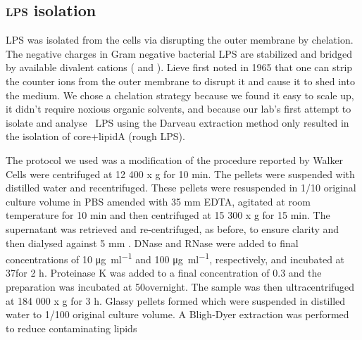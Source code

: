 	\subsection{\textsc{lps} isolation} %
	\label{sub:LPS_isolation}
  \ac{LPS} was isolated from the cells via disrupting the outer membrane by chelation.  The negative charges in Gram negative bacterial \ac{LPS} are stabilized and bridged by available
  divalent cations (\ie{}  and ). Lieve first noted in 1965 that
  one can strip the counter ions from the outer membrane to disrupt it and cause it to shed into the
  medium. We chose a chelation strategy because we found it easy to scale up, it didn't require
  noxious organic solvents, and because our lab's first attempt to isolate and analyse \caulobacter\
  \ac{LPS} using the Darveau extraction method only
  resulted in the isolation of core+lipidA (rough \ac{LPS}).

  The protocol we used was a modification of the procedure reported by Walker
  \etal\!\upcite{walker94} Cells were centrifuged at 12 400 x g for 10 min. The pellets were
  suspended with distilled water and recentrifuged. These pellets were resuspended in 1/10 original
  culture volume in \ac{PBS}\upcite{maniatis} amended with 35 \si{\milli\meter} \ac{EDTA}, agitated
  at room temperature for 10 min and then centrifuged at 15 300 x g for 15 min. The supernatant was
  retrieved and re-centrifuged, as before, to ensure clarity and then dialysed against 5
  \si{\milli\meter} \ce{MgCl2}. DNase and RNase were added to final concentrations of 10
  \si{\micro\gram\per\milli\litre} and 100 \si{\micro\gram\per\milli\litre}\!, respectively, and
  incubated at 37\cel for 2 h. Proteinase K was added to a final concentration of 0.3 \mgperml and
  the preparation was incubated at 50\cel overnight. The sample was then ultracentrifuged at 184 000
  x g for 3 h. Glassy pellets formed which were suspended in distilled water to 1/100 original
  culture volume. A Bligh-Dyer extraction was performed to reduce contaminating
  lipids\upcite[.]{blighdyer}

